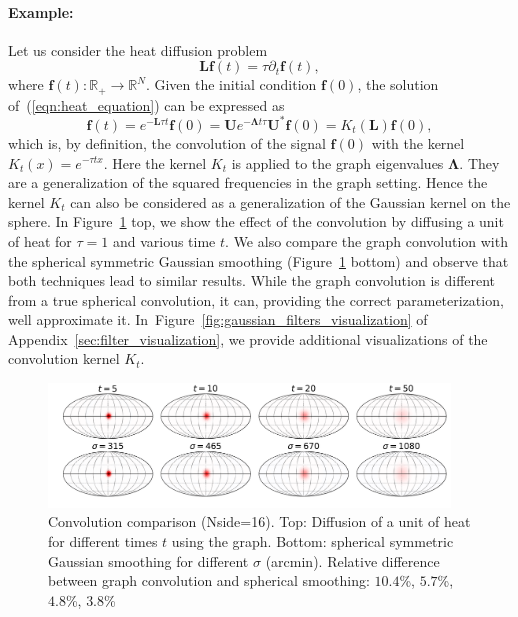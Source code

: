 \documentclass[final,twocolumn,3p,times,authoryear]{elsarticle}
\newcommand{\figref}[1]{Figure~\ref{fig:#1}}
\newcommand{\eqnref}[1]{(\ref{eqn:#1})}
\renewcommand{\b}[1]{{\bm{#1}}}   %
\newcommand{\1}{\b{1}}              %
\newcommand{\0}{\b{0}}              %
\newcommand{\g}[1]{\b{#1}}
\renewcommand{\L}{\b{L}} %
\newcommand{\U}{\b{U}}
\newcommand{\bLambda}{\b{\Lambda}}
\begin{document}
\paragraph{Example:}
Let us consider the heat diffusion problem
\begin{equation} \label{eqn:heat_equation}
\L \b{f}(t) = \tau \partial_t \b{f}(t),
\end{equation}
where $\b{f}(t): \mathbb{R}_+ \rightarrow \mathbb{R}^N$. Given the initial condition
$\b{f}(0)$, the solution of~\eqnref{heat_equation} can be expressed as
\begin{equation}
\b{f}(t) = e^{-\L \tau t} \b{f}(0) = \U e^{-\bLambda t \tau} \U^* \g{f}(0) = K_t(\L) \b{f}(0),
\end{equation}
which is, by definition, the convolution of the signal $\b{f}(0)$ with the kernel $K_t(x)=e^{-\tau
t x}$. Here the kernel $K_t$ is applied to the graph eigenvalues $\bLambda$. They are a generalization of the squared frequencies in the graph setting. Hence the kernel $K_t$ can also be considered as a generalization of the
Gaussian kernel on the sphere. In \figref{gaussian_filters_comparizon} top, we show
the effect of the convolution by diffusing a unit of heat for $\tau=1$ and various
time $t$. We also compare the graph convolution with the
spherical symmetric Gaussian smoothing
(\figref{gaussian_filters_comparizon} bottom) and observe that both
techniques lead to similar results. While the graph convolution is different
from a true spherical convolution, it can, providing the correct
parameterization, well approximate it.
In~\figref{gaussian_filters_visualization} of Appendix~\ref{sec:filter_visualization}, we provide additional visualizations of the
convolution kernel $K_t$.

\begin{figure}[!ht]
\centering
\includegraphics[width=0.95\textwidth]{figures/gaussian_filters_sphere.pdf}
\caption{Convolution comparison (Nside=16).
Top: Diffusion of a unit of heat for different times $t$ using the graph.
Bottom: spherical symmetric Gaussian smoothing for different $\sigma$ (arcmin).
Relative difference between graph convolution and spherical smoothing: $10.4$\%, $5.7$\%, $4.8$\%, $3.8$\% }
\label{fig:gaussian_filters_comparizon}
\end{figure}
\end{document}
